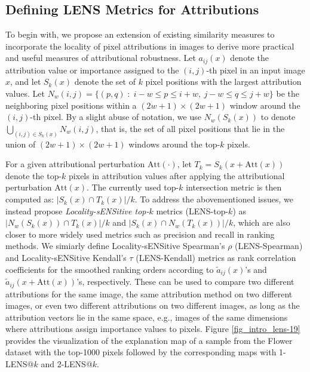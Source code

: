 \documentclass[letterpaper]{article} %
\newcommand{\size}[1]{\left|#1\right|}
\begin{document}
\subsection{Defining LENS Metrics for Attributions} \label{subsec:define-lens}
To begin with, we propose an extension of existing similarity measures to incorporate the locality of pixel attributions in images to derive more practical and useful measures of attributional robustness. Let $a_{ij}(x)$ denote the attribution value or importance assigned to the $(i, j)$-th pixel in an input image $x$, and let $S_{k}(x)$ denote the set of $k$ pixel positions with the largest attribution values. Let $N_{w}(i, j) = \{(p, q) \;:\; i-w \leq p \leq i+w,~ j-w \leq q \leq j+w\}$ be the neighboring pixel positions within a $(2w+1) \times (2w+1)$ window around the $(i, j)$-th pixel. By a slight abuse of notation, we use $N_{w}(S_{k}(x))$ to denote $\bigcup_{(i, j) \in S_{k}(x)} N_{w}(i, j)$, that is, the set of all pixel positions that lie in the union of $(2w+1) \times (2w+1)$ windows around the top-$k$ pixels.

For a given attributional perturbation $\mathrm{Att}(\cdot)$, let $T_{k} = S_{k}(x + \mathrm{Att}(x))$ denote the top-$k$ pixels in attribution values after applying the attributional perturbation $\mathrm{Att}(x)$. The currently used top-$k$ intersection metric is then computed as: $\size{S_{k}(x) \cap T_{k}(x)}/k$. To address the abovementioned issues, we instead propose \emph{Locality-sENSitive top-$k$} metrics (LENS-top-$k$) as $\size{N_{w}(S_{k}(x)) \cap T_{k}(x)}/k$ and $\size{S_{k}(x) \cap N_{w}(T_{k}(x))}/k$, which are also closer to more widely used metrics such as precision and recall in ranking methods. We simiarly define Locality-sENSitive Spearman's $\rho$ (LENS-Spearman) and Locality-sENSitive Kendall's $\tau$ (LENS-Kendall) metrics as rank correlation coefficients for the smoothed ranking orders according to $\tilde{a}_{ij}(x)$'s and $\tilde{a}_{ij}(x + \mathrm{Att}(x))$'s, respectively. These can be used to compare two different attributions for the same image, the same attribution method on two different images, or even two different attributions on two different images, as long as the attribution vectors lie in the same space, e.g., images of the same dimensions where attributions assign importance values to pixels. Figure \ref{fig_intro_lens-19} provides the visualization of the explanation map of a sample from the Flower dataset with the top-1000 pixels followed by the corresponding maps with 1-LENS@$k$ and 2-LENS@$k$.
\end{document}
